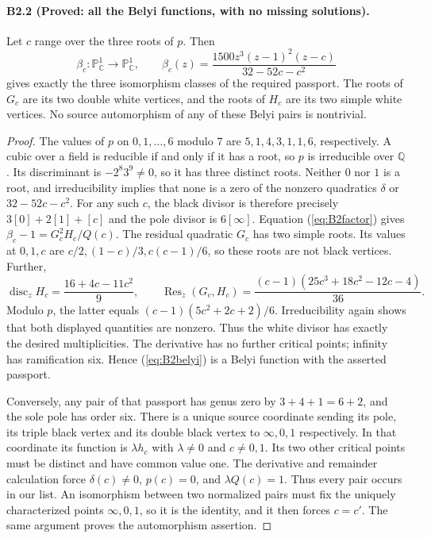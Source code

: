 \paragraph{B2.2 (Proved: all the Belyi functions, with no missing solutions).}
Let $c$ range over the three roots of $p$. Then
\begin{equation}\label{eq:B2belyi}
 \beta_c:\mathbb P^1_{\mathbb C}\longrightarrow\mathbb P^1_{\mathbb C},
 \qquad
 \beta_c(z)=\frac{1500z^3(z-1)^2(z-c)}{32-52c-c^2}
\end{equation}
gives exactly the three isomorphism classes of the required passport.
The roots of $G_c$ are its two double white vertices, and the roots of
$H_c$ are its two simple white vertices. No source automorphism of any
of these Belyi pairs is nontrivial.

\begin{proof}
The values of $p$ on $0,1,\ldots,6$ modulo $7$ are
$5,1,4,3,1,1,6$, respectively. A cubic over a field is reducible
if and only if it has a root, so $p$ is irreducible over $\mathbb Q$.
Its discriminant is $-2^8 3^9\ne0$, so it has three distinct roots.
Neither $0$ nor $1$ is a root, and irreducibility implies that none
is a zero of the nonzero quadratics $\delta$ or $32-52c-c^2$.
For any such $c$, the black divisor is therefore precisely
$3[0]+2[1]+[c]$ and the pole divisor is $6[\infty]$.
Equation (\ref{eq:B2factor}) gives
$\beta_c-1=G_c^2H_c/Q(c)$.
The residual quadratic $G_c$ has two simple roots. Its values at
$0,1,c$ are $c/2,(1-c)/3,c(c-1)/6$, so these roots are not black
vertices. Further,
\[
 \operatorname{disc}_z H_c=\frac{16+4c-11c^2}{9},\qquad
 \operatorname{Res}_z(G_c,H_c)
 =\frac{(c-1)(25c^3+18c^2-12c-4)}{36}.
\]
Modulo $p$, the latter equals
$(c-1)(5c^2+2c+2)/6$. Irreducibility again shows that both displayed
quantities are nonzero. Thus the white divisor has exactly the desired
multiplicities. The derivative has no further critical points; infinity
has ramification six. Hence (\ref{eq:B2belyi}) is a Belyi function with
the asserted passport.

Conversely, any pair of that passport has genus zero by
$3+4+1=6+2$, and the sole pole has order six. There is a unique source
coordinate sending its pole, its triple black vertex and its double
black vertex to $\infty,0,1$ respectively. In that coordinate its
function is $\lambda h_c$ with $\lambda\ne0$ and $c\ne0,1$.
Its two other critical points must be distinct and have common
value one. The derivative and remainder calculation force
$\delta(c)\ne0$, $p(c)=0$, and $\lambda Q(c)=1$.
Thus every pair occurs in our list. An isomorphism between two
normalized pairs must fix the uniquely characterized points
$\infty,0,1$, so it is the identity, and it then forces $c=c'$.
The same argument proves the automorphism assertion.
\end{proof}

